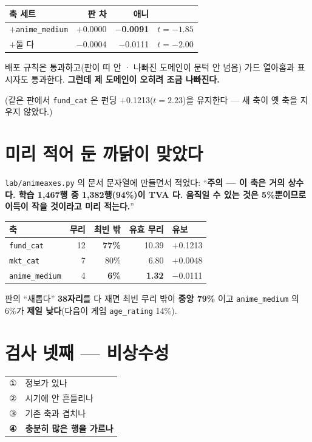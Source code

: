 \documentclass[10pt]{article}
\begin{document}
\begin{center}\small
\begin{tabular}{lrrl}
\hline
축 세트 & 판 차 & 애니 & \\
\hline
$+$\texttt{anime\_medium} & $+$0.0000 & \textbf{$-$0.0091} & $t{=}{-}1.85$ \\
$+$둘 다 & $-$0.0004 & $-$0.0111 & $t{=}{-}2.00$ \\
\hline
\end{tabular}
\end{center}

배포 규칙은 통과하고(판이 띠 안 · 나빠진 도메인이 문턱 안 넘음) 가드 열아홉과
표시자도 통과한다. \textbf{그런데 제 도메인이 오히려 조금 나빠진다.}

(같은 판에서 \texttt{fund\_cat} 은 펀딩 $+$0.1213($t{=}2.23$)을 유지한다 ---
새 축이 옛 축을 지우지 않았다.)

\section{미리 적어 둔 까닭이 맞았다}

\texttt{lab/animeaxes.py} 의 문서 문자열에 만들면서 적었다:
``\textbf{주의 --- 이 축은 거의 상수다. 학습 1,467행 중 1,382행(94\%)이
TVA 다. 움직일 수 있는 것은 5\%뿐이므로 이득이 작을 것이라고 미리 적는다.}''

\begin{center}\footnotesize
\begin{tabular}{lrrrl}
\hline
축 & 무리 & 최빈 밖 & 유효 무리 & 유보 \\
\hline
\texttt{fund\_cat} & 12 & \textbf{77\%} & 10.39 & $+$0.1213 \\
\texttt{mkt\_cat} & 7 & 80\% & 6.80 & $+$0.0048 \\
\texttt{anime\_medium} & 4 & \textbf{6\%} & \textbf{1.32} & $-$0.0111 \\
\hline
\end{tabular}
\end{center}

판의 ``새롭다'' \textbf{38자리}를 다 재면 최빈 무리 밖이 \textbf{중앙 79\%}
이고 \texttt{anime\_medium} 의 6\%가 \textbf{제일 낮다}(다음이 게임
\texttt{age\_rating} 14\%).

\section{검사 넷째 --- 비상수성}

\begin{center}\small
\begin{tabular}{ll}
\hline
① & 정보가 있나 \\
② & 시기에 안 흔들리나 \\
③ & 기존 축과 겹치나 \\
\textbf{④} & \textbf{충분히 많은 행을 가르나} \\
\hline
\end{tabular}
\end{center}
\end{document}
